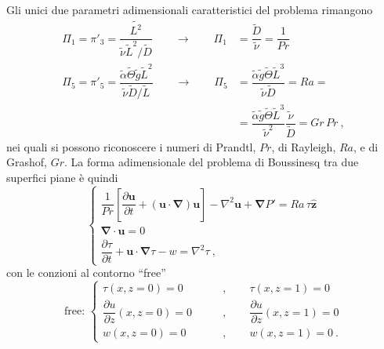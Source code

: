 Gli unici due parametri adimensionali caratteristici del problema rimangono
\begin{equation}
\begin{aligned}
 \Pi_1 = \pi'_3 = \dfrac{\tilde{L^2}}{\tilde{\nu} \tilde{L}^2/\tilde{D}} \qquad \rightarrow \qquad \Pi_1  & = \dfrac{\tilde{D}}{\tilde{\nu}} = \dfrac{1}{Pr} \\
 \Pi_5 = \pi'_5 = \dfrac{\tilde{\alpha}\tilde{\Theta} \tilde{g} \tilde{L}^2}{\tilde{\nu} \tilde{D}/\tilde{L}} \qquad \rightarrow \qquad \Pi_5 & = \dfrac{\tilde{\alpha}\tilde{g}\tilde{\Theta}  \tilde{L}^3}{\tilde{\nu} \tilde{D}} = Ra = \\
 & = \dfrac{\tilde{\alpha}\tilde{g}\tilde{\Theta}  \tilde{L}^3}{\tilde{\nu}^2}\dfrac{\tilde{\nu}}{\tilde{D}} = Gr \, Pr \ ,
\end{aligned}
\end{equation}
nei quali si possono riconoscere i numeri di Prandtl, $Pr$, di Rayleigh, $Ra$, e di Grashof, $Gr$.
%
\newline
La forma adimensionale del problema di Boussinesq tra due superfici piane è quindi
\begin{equation}\label{eqn:Bouss-tau-adim-3}
    \begin{cases}
      \dfrac{1}{Pr} \left[ \dfrac{\partial \bm{u}}{\partial t} +
      \left( \bm{u} \cdot \bm{\nabla} \right) \bm{u} \right] -
      \nabla^2 \bm{u} + \bm{\nabla} P' = Ra \, \tau \bm{\hat{z}} \\
      \bm{\nabla} \cdot \bm{u} = 0 \\
      \dfrac{\partial \tau}{\partial t} + \bm{u} \cdot 
      \bm{\nabla} \tau -  w = \nabla^{2} \tau \ ,
    \end{cases}
\end{equation}
con le conzioni al contorno ``free''
\begin{equation}\label{eqn:Bouss-adim-3-bc}
    \text{free: }
    \left\{
    \begin{aligned}
      \tau(x,z=0) = 0 \qquad  & , \qquad 
      \tau(x,z=1) = 0 \\
      \dfrac{\partial u}{\partial z}(x,z=0) = 0 \qquad & , \qquad 
      \dfrac{\partial u}{\partial z}(x,z=1) = 0 \\
      w(x,z=0) = 0 \qquad & , \qquad w(x,z=1) = 0 \ .
    \end{aligned} \right.
\end{equation}

